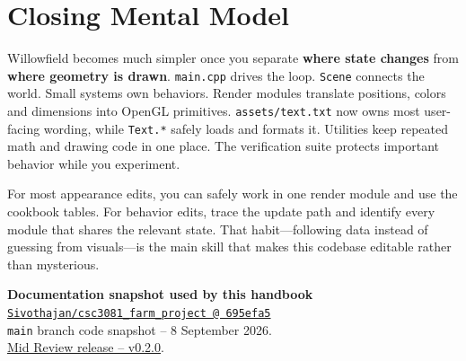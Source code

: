 \documentclass[11pt,a4paper,openany]{book}
\newcommand{\code}[1]{\texttt{#1}}
\newcommand{\file}[1]{\nolinkurl{#1}}
\begin{document}
\chapter*{Closing Mental Model}
Willowfield becomes much simpler once you separate \textbf{where state changes} from \textbf{where geometry is drawn}. \file{main.cpp} drives the loop. \code{Scene} connects the world. Small systems own behaviors. Render modules translate positions, colors and dimensions into OpenGL primitives. \file{assets/text.txt} now owns most user-facing wording, while \code{Text.*} safely loads and formats it. Utilities keep repeated math and drawing code in one place. The verification suite protects important behavior while you experiment.

For most appearance edits, you can safely work in one render module and use the cookbook tables. For behavior edits, trace the update path and identify every module that shares the relevant state. That habit---following data instead of guessing from visuals---is the main skill that makes this codebase editable rather than mysterious.

\vfill
\begin{center}
	\color{Muted}\small
	\textbf{Documentation snapshot used by this handbook}\\[0.18cm]
	\href{https://github.com/Sivothajan/csc3081_farm_project/tree/695efa55384de87452d60e0aaabfff137de02fd4}{\texttt{Sivothajan/csc3081\_farm\_project @ 695efa5}}\\
	\code{main} branch code snapshot -- 8 September 2026.\\
	\href{https://github.com/Sivothajan/csc3081_farm_project/releases/tag/v0.2.0}{Mid Review release -- v0.2.0}.
\end{center}
\end{document}
